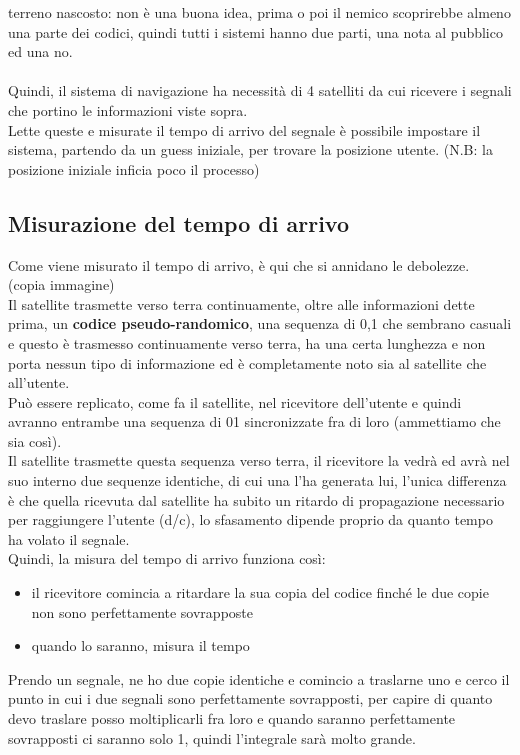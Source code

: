 \documentclass[oneside, 12pt]{extbook}
\begin{document}
terreno nascosto: non è una buona idea, prima o poi il nemico scoprirebbe almeno una parte dei codici, quindi tutti i sistemi hanno due parti, una nota al pubblico ed una no.\\\\
Quindi, il sistema di navigazione ha necessità di 4 satelliti da cui ricevere i segnali che portino le informazioni viste sopra.\\
Lette queste e misurate il tempo di arrivo del segnale è possibile impostare il sistema, partendo da un guess iniziale, per trovare la posizione utente. (N.B: la posizione iniziale inficia poco il processo)


\subsection{Misurazione del tempo di arrivo}
Come viene misurato il tempo di arrivo, è qui che si annidano le debolezze.\\
(copia immagine)\\
Il satellite trasmette verso terra continuamente, oltre alle informazioni dette prima, un \textbf{codice pseudo-randomico}, una sequenza di 0,1 che sembrano casuali e questo è trasmesso continuamente verso terra, ha una certa lunghezza e non porta nessun tipo di informazione ed è completamente noto sia al satellite che all'utente.\\
Può essere replicato, come fa il satellite, nel ricevitore dell'utente e quindi avranno entrambe una sequenza di 01 sincronizzate fra di loro (ammettiamo che sia così).\\
Il satellite trasmette questa sequenza verso terra, il ricevitore la vedrà ed avrà nel suo interno due sequenze identiche, di cui una l'ha generata lui, l'unica differenza è che quella ricevuta dal satellite ha subito un ritardo di propagazione necessario per raggiungere l'utente (d/c), lo sfasamento dipende proprio da quanto tempo ha volato il segnale.\\
Quindi, la misura del tempo di arrivo funziona così:
\begin{itemize}
	\item il ricevitore comincia a ritardare la sua copia del codice finché le due copie non sono perfettamente sovrapposte
	\item quando lo saranno, misura il tempo
\end{itemize}
Prendo un segnale, ne ho due copie identiche e comincio a traslarne uno e cerco il punto in cui i due segnali sono perfettamente sovrapposti, per capire di quanto devo traslare posso moltiplicarli fra loro e quando saranno perfettamente sovrapposti ci saranno solo 1, quindi l'integrale sarà molto grande.\\
\end{document}
